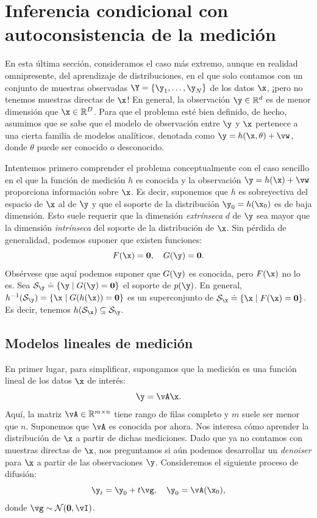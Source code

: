 \documentclass[../../book-main_es.tex]{subfiles}
\begin{document}
\section{Inferencia condicional con autoconsistencia de la medición}
\label{sec:measurement-self-consistency}
En esta última sección, consideramos el caso más extremo, aunque en realidad
omnipresente, del aprendizaje de distribuciones, en el que solo contamos con un
conjunto de muestras observadas $\Y = \{\y_1,\ldots, \y_N\}$ de los datos
$\x$, ¡pero no tenemos muestras directas de $\x$! En general, la observación
$\y \in \mathbb{R}^d$ es de menor dimensión que $\x \in
\mathbb{R}^D$. Para que el problema esté bien definido, de hecho, asumimos que
se sabe que el modelo de observación entre $\y$ y $\x$ pertenece a una
cierta familia de modelos analíticos, denotada como $\y = h(\x, \theta)
+\vw$, donde $\theta$ puede ser conocido o desconocido.

Intentemos primero comprender el problema conceptualmente con el
caso sencillo en el que la función de medición $h$ es conocida y la
observación $\y = h(\x) + \vw$ proporciona información sobre $\x$. Es decir,
suponemos que $h$ es sobreyectiva del espacio de $\x$ al de $\y$
y que el soporte de la distribución $\y_0 = h(\x_0)$ es
de baja dimensión. Esto suele requerir que la dimensión \textit{extrínseca}
$d$ de $\y$ sea mayor que la dimensión \textit{intrínseca}
del soporte de la distribución de $\x$. Sin pérdida de
generalidad, podemos suponer que existen funciones:
\begin{equation}
    F(\x) = \boldsymbol{0},\quad     G(\y) = \boldsymbol{0}.
\end{equation}
Obsérvese que aquí podemos suponer que $G(\y)$ es conocida, pero $F(\x)$ no lo es.
Sea $\mathcal{S}_{\y} \doteq \{\y \mid G(\y) = \boldsymbol{0}\}$ el
soporte de $p(\y)$. En general, $h^{-1}(\mathcal{S}_{\y}) = \{\x
\mid G(h(\x)) = \boldsymbol{0}\}$ es un superconjunto de $\mathcal{S}_{\x}
\doteq \{\x \mid F(\x) = \boldsymbol{0}\}$. Es decir, tenemos
$h(\mathcal{S}_{\x}) \subseteq \mathcal{S}_{\y}$.

\subsection{Modelos lineales de medición}
En primer lugar, para simplificar, supongamos que la medición es una
función lineal de los datos $\x$ de interés:
\begin{equation}
    \y = \vA\x.
\end{equation}
Aquí, la matriz $\vA \in \mathbb{R}^{m\times n}$ tiene rango de filas completo
y $m$ suele ser menor que $n$. Suponemos que $\vA$ es conocida por
ahora. Nos interesa cómo aprender la distribución de $\x$ a partir de
dichas mediciones. Dado que ya no contamos con muestras directas de $\x$, nos
preguntamos si aún podemos desarrollar un \textit{denoiser} para $\x$ a partir de
las observaciones $\y$. Consideremos el siguiente proceso de difusión:
\begin{equation}
    \y_t = \y_0 + t \vg, \quad \y_0 = \vA(\x_0),
\end{equation}
donde $\vg \sim \mathcal{N}(\boldsymbol{0}, \vI)$.
\end{document}
